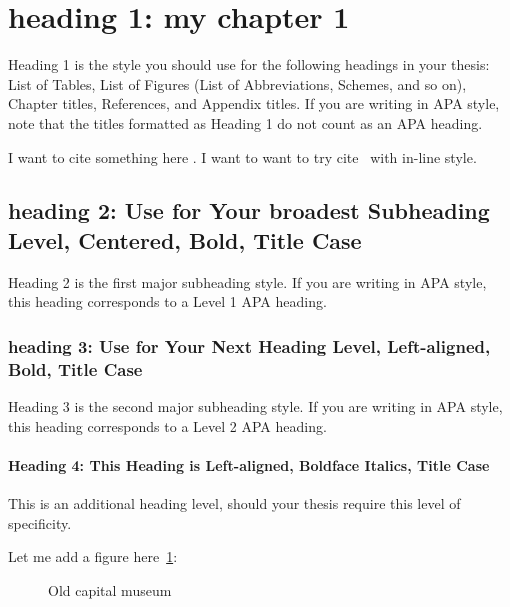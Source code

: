 \section{heading 1: my chapter 1}

Heading 1 is the style you should use for the following headings in your thesis: List of Tables, List of Figures (List of Abbreviations, Schemes, and so on), Chapter titles, References, and Appendix titles. If you are writing in APA style, note that the titles formatted as Heading 1 do not count as an APA heading.

I want to cite something here \parencite{zuo2019standing}. I want to want to try cite~\textcite{zuo2019standing} with in-line style.

\subsection{heading 2: Use for Your broadest Subheading Level, Centered, Bold, Title Case}

Heading 2 is the first major subheading style. If you are writing in APA style, this heading corresponds to a Level 1 APA heading.

\subsubsection{heading 3: Use for Your Next Heading Level, Left-aligned, Bold, Title Case}

Heading 3 is the second major subheading style. If you are writing in APA style, this heading corresponds to a Level 2 APA heading.

\paragraph{Heading 4: This Heading is Left-aligned, Boldface Italics, Title Case}
This is an additional heading level, should your thesis require this level of specificity.

Let me add a figure here~\cref{fig:1}:
\begin{figure}[h]
  \centering
  \captionsetup{width=0.6\linewidth} %
  \caption{Old capital museum}
  \label{fig:1}
\end{figure}
